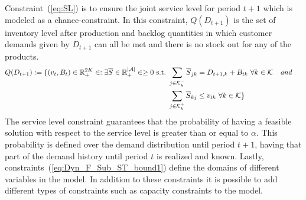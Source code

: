 \documentclass[10pt]{article}
\newcommand{\ti}{t} %
\newcommand{\ka}{k} %
\newcommand{\KA}{\mathcal{K}}
\newcommand{\Ka}{K}
\newcommand{\jey}{j} %
\newcommand{\Graf}{\mathcal{A}} %
\newcommand{\Bi}{B} %
\newcommand{\Vi}{v} %
\newcommand{\Es}{S} %
\newcommand{\InvPos}{inventory level after production }
\newcommand{\Csub}{\mathcal{K}^+_k}
\newcommand{\Psub}{\mathcal{K}^-_k}
\begin{document}
Constraint~(\ref{eq:SL}) is to ensure the joint service level for period $\ti+1$ which is modeled as a chance-constraint. In this constraint, $Q(D_ {\ti+1})$ is the set of \InvPos and backlog quantities in which customer demands given by $D_{\ti+1}$ can all be met and there is no stock out for any of the products.
\begin{align} Q(D_ {\ti +1}) := \{ (v_{\ti},B_{\ti}) \in \mathbb{R}_{+}^{2\Ka} \in  :  \exists \overline{\Es} \in \mathbb{R}_{+}^{|\Graf|} \in \geq 0 \ \text{s.t.} \ 
 & \sum_{\jey \in  \Psub} \overline{\Es}_{\jey \ka } = D_{\ti+1,\ka} + \Bi_{\ti\ka} \ \forall \ka  \in \KA  \quad \textit{and }\notag \\
 & \sum_{\jey \in  \Csub} \overline{\Es}_{\ka \jey} \leq \Vi_{\ti\ka} \ \forall \ka  \in \KA \} & \label{eq:SetQ}
 \end{align}
  The service level constraint guarantees that the probability of having a feasible solution with respect to the service level is greater than or equal to $\alpha$. 
 This probability is defined over the demand distribution until period $\ti+1$, having that part of the demand history until period $\ti$ is realized and known. Lastly, constraints~(\ref{eq:Dyn_F_Sub_ST_bound1}) define the domains of different variables in the model.
In addition to these constraints it is possible to add different types of constraints such as capacity constraints to the model.
\end{document}
